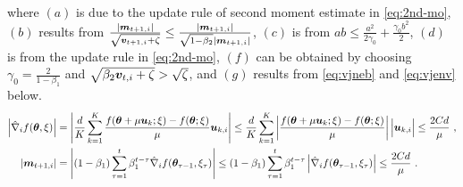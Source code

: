 \begin{appendices}
\begin{equation}
\begin{aligned}
\end{aligned}
\end{equation}
where $(a)$ is due to the update rule of second moment estimate in \eqref{eq:2nd-mo}, $(b)$ results from $\frac{\left|{\bm{m}}_{t+1,i}\right|}{\sqrt{{\bm{v}}_{t+1,i} + \zeta}} \leq \frac{\left|{\bm{m}}_{t+1,i}\right|}{\sqrt{1 - \beta_2}\left|{\bm{m}}_{t+1,i}\right|}$, $(c)$ is from $ab \leq \frac{a^2}{2\gamma_0} + \frac{\gamma_0 b^2}{2}$, $(d)$ is from the update rule in \eqref{eq:2nd-mo}, $(f)$ can be obtained by choosing $\gamma_0 = \frac{2}{1-\beta_1}$ and $\sqrt{\beta_2{\bm{v}}_{t,i} + \zeta} > \sqrt{\zeta}$, and $(g)$ results from \eqref{eq:vjneb} and \eqref{eq:vjenv} below.
\begin{align}
\left|\hat{\nabla}_i f({\bm{\theta}}, \xi)\right| &= \left|\frac{d}{K}\sum_{k=1}^K\frac{f({\bm{\theta}} + \mu {\bm{u}}_k; \xi) - f({\bm{\theta}}; \xi)}{\mu} {\bm{u}}_{k,i}\right| \leq \frac{d}{K}\sum_{k=1}^K \left|\frac{f({\bm{\theta}} + \mu {\bm{u}}_k; \xi) - f({\bm{\theta}}; \xi)}{\mu}\right|\Big|{\bm{u}}_{k,i}\Big| \leq \frac{2Cd}{\mu} \ , \\
\left|{\bm{m}}_{t+1,i}\right| &= \left|(1-\beta_1)\sum_{\tau=1}^t \beta_1^{t-\tau} \hat{\nabla}_i f({\bm{\theta}}_{\tau-1}, \xi_{\tau})\right| \leq (1-\beta_1)\sum_{\tau=1}^t \beta_1^{t-\tau} \left|\hat{\nabla}_i f({\bm{\theta}}_{\tau-1}, \xi_{\tau})\right| \leq \frac{2Cd}{\mu} \ . \label{eq:vjenv}
\end{align}



\end{appendices}
